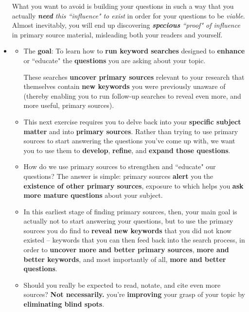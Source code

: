 \documentclass[11pt]{article}
\begin{document}
\begin{itemize}
What you want to avoid is building your questions in such a way that you actually \emph{\textbf{need} this ``influence" to exist} in order for your questions to be \emph{viable}. Almost inevitably, you will end up discovering \emph{\textbf{specious} ``proof" of influence} in primary source material, misleading both your readers and yourself.

\item \begin{exercise}
\begin{itemize}
\item The \textbf{goal}: To learn how to \textbf{run keyword searches} designed to \textbf{enhance} or ``educate" the \textbf{questions} you are asking about your topic. 

These searches \textbf{uncover primary sources} relevant to your research that themselves contain \textbf{new keywords} you were previously unaware of (thereby enabling you to run follow-up searches to reveal even more, and more useful, primary sources).

\item This next exercise requires you to delve back into your \textbf{specific subject matter} and into \textbf{primary sources}. Rather than trying to use primary sources to start answering the questions you’ve come up with, we want you to use them to \textbf{develop}, \textbf{refine}, and \textbf{expand those questions}.

\item How do we use primary sources to strengthen and ``educate" our questions? The answer is simple: primary sources \textbf{alert} you the \textbf{existence of other primary sources}, exposure to which helps you \textbf{ask more mature questions} about your subject.

\item In this earliest stage of finding primary sources, then, your main goal is actually not to start answering your questions, but to use the primary sources you do find to \textbf{reveal new keywords} that you did not know existed --  keywords that you can then feed back into the search process, in order to \textbf{uncover more and better primary sources}, \textbf{more and better keywords}, and most importantly of all, \textbf{more and better questions}.

\item Should you really be expected to read, notate, and cite even more sources?  \textbf{Not necessarily.} you’re \textbf{improving} your grasp of your topic by \textbf{eliminating blind spots}.


\end{itemize}
\end{exercise}
\end{itemize}
\end{document}
